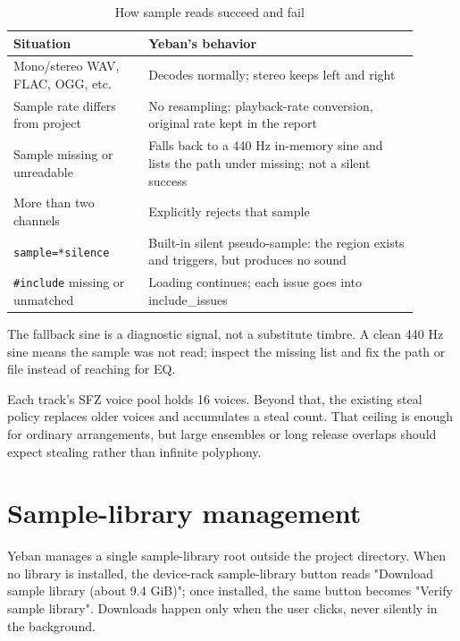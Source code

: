 \begin{table}[htbp]
\centering
\small
\begin{tabular}{@{}p{0.30\linewidth}p{0.60\linewidth}@{}}
\hline
Situation & Yeban's behavior \\
\hline
Mono/stereo WAV, FLAC, OGG, etc. & Decodes normally; stereo keeps left and right \\
Sample rate differs from project & No resampling; playback-rate conversion, original rate kept in the report \\
Sample missing or unreadable & Falls back to a 440 Hz in-memory sine and lists the path under missing; not a silent success \\
More than two channels & Explicitly rejects that sample \\
\texttt{sample=*silence} & Built-in silent pseudo-sample: the region exists and triggers, but produces no sound \\
\texttt{\#include} missing or unmatched & Loading continues; each issue goes into include\_issues \\
\hline
\end{tabular}
\caption{How sample reads succeed and fail}
\label{tab:sfz-samples}
\end{table}

The fallback sine is a diagnostic signal, not a substitute timbre. A clean 440 Hz sine means the sample was not read; inspect the missing list and fix the path or file instead of reaching for EQ.

Each track's SFZ voice pool holds 16 voices. Beyond that, the existing steal policy replaces older voices and accumulates a steal count. That ceiling is enough for ordinary arrangements, but large ensembles or long release overlaps should expect stealing rather than infinite polyphony.


\section{Sample-library management}

Yeban manages a single sample-library root outside the project directory. When no library is installed, the device-rack sample-library button reads "Download sample library (about 9.4 GiB)"; once installed, the same button becomes "Verify sample library". Downloads happen only when the user clicks, never silently in the background.

